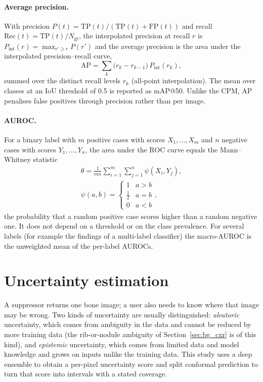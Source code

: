 \paragraph{Average precision.} With precision $P(t)=\mathrm{TP}(t)/(\mathrm{TP}(t)+\mathrm{FP}(t))$ and recall
$\mathrm{Rec}(t)=\mathrm{TP}(t)/N_{\mathrm{gt}}$, the interpolated precision at recall $r$ is $P_{\mathrm{int}}(r)=\max_{r'\ge r}P(r')$ and the
average precision is the area under the interpolated precision--recall curve,
\begin{equation}
\mathrm{AP}=\sum_k\big(r_k-r_{k-1}\big)\,P_{\mathrm{int}}(r_k),
\label{eq:bg_ap}
\end{equation}
summed over the distinct recall levels $r_k$ (all-point interpolation). The mean over classes at an IoU threshold of 0.5 is reported as
mAP@50. Unlike the CPM, AP penalises false positives through precision rather than per image.

\paragraph{AUROC.} For a binary label with $m$ positive cases with scores $X_1,\dots,X_m$ and $n$ negative cases with scores $Y_1,\dots,Y_n$, the
area under the ROC curve equals the Mann--Whitney statistic
\begin{equation}
\begin{gathered}
\hat\theta=\frac{1}{mn}\sum_{i=1}^{m}\sum_{j=1}^{n}\psi(X_i,Y_j),\\
\psi(a,b)=\begin{cases}1 & a>b\\ \tfrac12 & a=b\\ 0 & a<b\end{cases},
\end{gathered}
\label{eq:bg_auc}
\end{equation}
the probability that a random positive case scores higher than a random negative one. It does not depend on a threshold or on the class
prevalence. For several labels (for example the findings of a multi-label classifier) the macro-AUROC is the unweighted mean of the per-label AUROCs.

\section{Uncertainty estimation}
\label{sec:bg_uncertainty}
A suppressor returns one bone image; a user also needs to know where that image may be wrong. Two kinds of uncertainty are usually distinguished:
\emph{aleatoric} uncertainty, which comes from ambiguity in the data and cannot be reduced by more training data (the rib-or-nodule ambiguity of
Section~\ref{sec:bg_cxr} is of this kind), and \emph{epistemic} uncertainty, which comes from limited data and model knowledge and grows on
inputs unlike the training data. This study uses a deep ensemble to obtain a per-pixel uncertainty score and split conformal prediction to turn
that score into intervals with a stated coverage.

